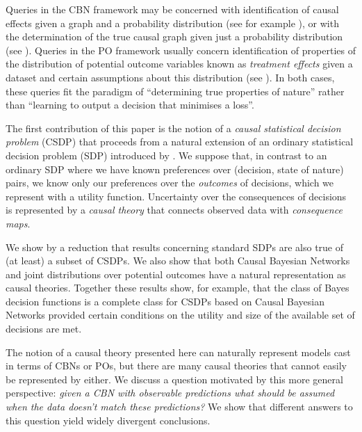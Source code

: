 Queries in the CBN framework may be concerned with identification of causal effects given a graph and a probability distribution (see for example \citep{tian2002general}), or with the determination of the true causal graph given just a probability distribution (see \citep{spirtes_causation_1993}). Queries in the PO framework usually concern identification of properties of the distribution of potential outcome variables known as \emph{treatment effects} given a dataset and certain assumptions about this distribution (see \citep{rubin_causal_2005,robins2010alternative}). In both cases, these queries fit the paradigm of ``determining true properties of nature'' rather than ``learning to output a decision that minimises a loss''.

The first contribution of this paper is the notion of a \emph{causal statistical decision problem} (CSDP) that proceeds from a natural extension of an ordinary statistical decision problem (SDP) introduced by \citep{wald_statistical_1950}. We suppose that, in contrast to an ordinary SDP where we have known preferences over (decision, state of nature) pairs, we know only our preferences over the \emph{outcomes} of decisions, which we represent with a utility function. Uncertainty over the consequences of decisions is represented by a \emph{causal theory} that connects observed data with \emph{consequence maps}. 

We show by a reduction that results concerning standard SDPs are also true of (at least) a subset of CSDPs.  We also show that both Causal Bayesian Networks and joint distributions over potential outcomes have a natural representation as causal theories. Together these results show, for example, that the class of Bayes decision functions is a complete class for CSDPs based on Causal Bayesian Networks provided certain conditions on the utility and size of the available set of decisions are met.

The notion of a causal theory presented here can naturally represent models cast in terms of CBNs or POs, but there are many causal theories that cannot easily be represented by either. We discuss a question motivated by this more general perspective: \emph{given a CBN with observable predictions what should be assumed when the data doesn't match these predictions?} We show that different answers to this question yield widely divergent conclusions.

